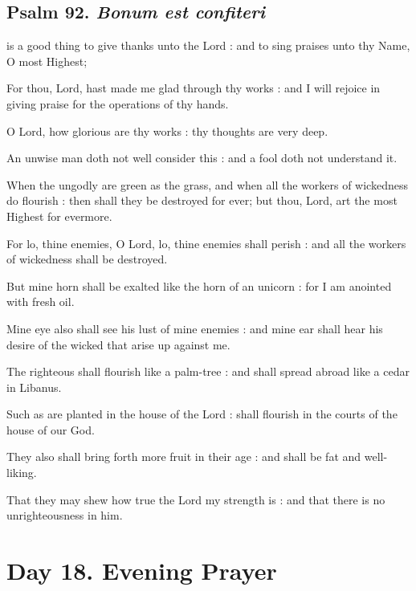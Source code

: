 \subsection{Psalm 92. \textit{Bonum est confiteri}}

 is a good thing to give thanks unto the Lord : and to sing praises unto thy Name, O most Highest;\par
{}
For thou, Lord, hast made me glad through thy works : and I will rejoice in giving praise for the operations of thy hands.\par
{}O Lord, how glorious are thy works : thy thoughts are very deep.\par
{}An unwise man doth not well consider this : and a fool doth not understand it.\par
{}When the ungodly are green as the grass, and when all the workers of wickedness do flourish : then shall they be destroyed for ever; but thou, Lord, art the most Highest for evermore.\par
{}For lo, thine enemies, O Lord, lo, thine enemies shall perish : and all the workers of wickedness shall be destroyed.\par
{}But mine horn shall be exalted like the horn of an unicorn : for I am anointed with fresh oil.\par
{}Mine eye also shall see his lust of mine enemies : and mine ear shall hear his desire of the wicked that arise up against me.\par
{}The righteous shall flourish like a palm-tree : and shall spread abroad like a cedar in Libanus.\par
{}Such as are planted in the house of the Lord : shall flourish in the courts of the house of our God.\par
{}They also shall bring forth more fruit in their age : and shall be fat and well-liking.\par
{}That they may shew how true the Lord my strength is : and that there is no unrighteousness in him.\par

\section*{Day 18. Evening Prayer}

